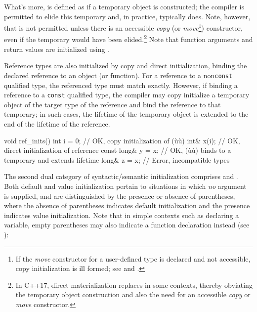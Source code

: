 \noindent What's more,  is defined as if a
temporary object is constructed; the compiler is permitted to elide this
temporary and, in practice, typically does. Note, however, that
 is not permitted unless there is an
accessible \emph{copy} (or \emph{move}{\cprotect\footnote{If the
\emph{move} constructor for a user-defined type is declared and not
accessible, copy initialization is ill formed; see  and .}}) constructor,
even if the temporary would have been elided.{\cprotect\footnote{In
C++17, direct materialization replaces  in some contexts, thereby obviating the temporary
object construction and also the need for an accessible \emph{copy} or
  \emph{move} constructor.}} Note that function arguments and return
values are initialized using .

Reference types are also initialized by copy and direct initialization,
binding the declared reference to an object (or function). For a
reference to a non\lstinline!const! qualified type, the referenced type
must match exactly. However, if binding a reference to a \lstinline!const!
qualified type, the compiler may copy initialize a temporary object of
the target type of the reference and bind the reference to that
temporary; in such cases, the lifetime of the temporary object is
extended to the end of the lifetime of the reference.

\begin{emcppslisting}
void ref_inits()
{
    int i = 0;          // OK, copy initialization of (ù{}ù)
    int& x(i);          // OK, direct initialization of reference
    const long& y = x;  // OK, (ù{}ù) binds to a temporary and extends lifetime
    long& z = x;        // Error, incompatible types
}
\end{emcppslisting}
    

\noindent The second dual category of syntactic/semantic initialization comprises
 and . Both default and value initialization pertain to
situations in which \emph{no} argument is supplied, and are
distinguished by the presence or absence of parentheses, where the
absence of parentheses indicates default initialization and the presence
indicates value initialization. Note that in simple contexts such as
declaring a variable, empty parentheses may also indicate a function
declaration instead (see ):

